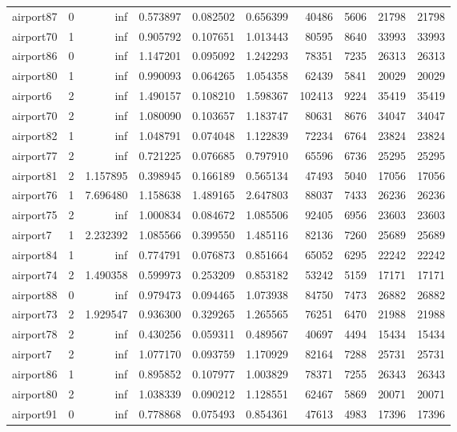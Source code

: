 \begin{longtable}{|l|r|r|r|r|r|r|r|r|r|}
airport87 & 0 & inf & 0.573897 & 0.082502 & 0.656399 & 40486 & 5606 & 21798 & 21798 \\
airport70 & 1 & inf & 0.905792 & 0.107651 & 1.013443 & 80595 & 8640 & 33993 & 33993 \\
airport86 & 0 & inf & 1.147201 & 0.095092 & 1.242293 & 78351 & 7235 & 26313 & 26313 \\
airport80 & 1 & inf & 0.990093 & 0.064265 & 1.054358 & 62439 & 5841 & 20029 & 20029 \\
airport6 & 2 & inf & 1.490157 & 0.108210 & 1.598367 & 102413 & 9224 & 35419 & 35419 \\
airport70 & 2 & inf & 1.080090 & 0.103657 & 1.183747 & 80631 & 8676 & 34047 & 34047 \\
airport82 & 1 & inf & 1.048791 & 0.074048 & 1.122839 & 72234 & 6764 & 23824 & 23824 \\
airport77 & 2 & inf & 0.721225 & 0.076685 & 0.797910 & 65596 & 6736 & 25295 & 25295 \\
airport81 & 2 & 1.157895 & 0.398945 & 0.166189 & 0.565134 & 47493 & 5040 & 17056 & 17056 \\
airport76 & 1 & 7.696480 & 1.158638 & 1.489165 & 2.647803 & 88037 & 7433 & 26236 & 26236 \\
airport75 & 2 & inf & 1.000834 & 0.084672 & 1.085506 & 92405 & 6956 & 23603 & 23603 \\
airport7 & 1 & 2.232392 & 1.085566 & 0.399550 & 1.485116 & 82136 & 7260 & 25689 & 25689 \\
airport84 & 1 & inf & 0.774791 & 0.076873 & 0.851664 & 65052 & 6295 & 22242 & 22242 \\
airport74 & 2 & 1.490358 & 0.599973 & 0.253209 & 0.853182 & 53242 & 5159 & 17171 & 17171 \\
airport88 & 0 & inf & 0.979473 & 0.094465 & 1.073938 & 84750 & 7473 & 26882 & 26882 \\
airport73 & 2 & 1.929547 & 0.936300 & 0.329265 & 1.265565 & 76251 & 6470 & 21988 & 21988 \\
airport78 & 2 & inf & 0.430256 & 0.059311 & 0.489567 & 40697 & 4494 & 15434 & 15434 \\
airport7 & 2 & inf & 1.077170 & 0.093759 & 1.170929 & 82164 & 7288 & 25731 & 25731 \\
airport86 & 1 & inf & 0.895852 & 0.107977 & 1.003829 & 78371 & 7255 & 26343 & 26343 \\
airport80 & 2 & inf & 1.038339 & 0.090212 & 1.128551 & 62467 & 5869 & 20071 & 20071 \\
airport91 & 0 & inf & 0.778868 & 0.075493 & 0.854361 & 47613 & 4983 & 17396 & 17396 \\

\end{longtable}
